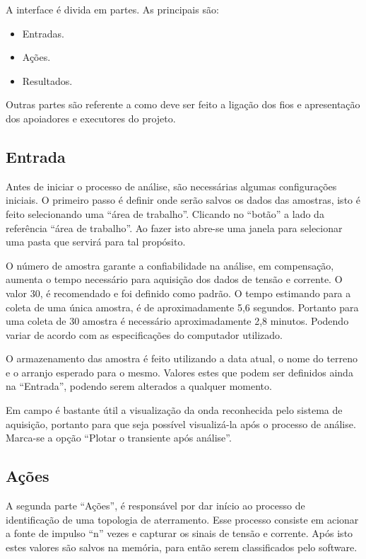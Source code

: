 \documentclass[a4paper, 10pt]{article}
\begin{document}
A interface é divida em partes. As principais são:

\begin{itemize}
    \item Entradas.
    \item Ações.
    \item Resultados.
\end{itemize}

Outras partes são referente a como deve ser feito a ligação dos fios e apresentação dos
apoiadores e executores do projeto.

\subsection{Entrada}

Antes de iniciar o processo de análise, são necessárias algumas configurações
iniciais. O primeiro passo é definir onde serão salvos os dados das amostras, 
isto é feito selecionando uma ``área de trabalho''. 
Clicando no ``botão'' a lado da referência ``área de trabalho''.
Ao fazer isto abre-se uma janela para selecionar uma pasta que 
servirá para tal propósito.





O número de amostra garante a confiabilidade na análise, em
compensação, aumenta o tempo necessário para aquisição dos dados de tensão e corrente. O valor 30, 
é recomendado e foi definido como padrão. 
O tempo estimando para a coleta de uma única amostra, é de aproximadamente 5,6 segundos. 
Portanto para uma coleta de 30 amostra é necessário aproximadamente 2,8 minutos. Podendo variar de 
acordo com as especificações do computador utilizado.

O armazenamento das amostra é feito utilizando a data atual, o nome do terreno e o arranjo esperado para 
o mesmo. Valores estes que podem ser definidos ainda na ``Entrada'', podendo serem alterados a qualquer
momento. 

Em campo é bastante útil a visualização da onda reconhecida pelo sistema de aquisição, portanto para 
que seja possível visualizá-la após o processo de análise. Marca-se a opção ``Plotar o transiente 
após análise''.

\subsection{Ações}

A segunda parte ``Ações'', é responsável por dar início ao processo de identificação de uma topologia
de aterramento. Esse processo consiste em acionar a fonte de impulso ``n'' vezes e capturar 
os sinais de tensão e corrente. Após isto estes valores são salvos na memória, para então serem 
classificados pelo software.
\end{document}
